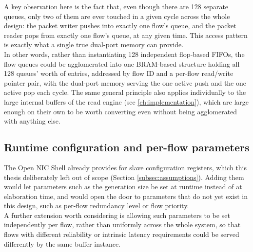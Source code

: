 A key observation here is the fact that, even though there are 128 separate queues,
only two of them are ever touched in a given cycle across the whole design: the packet writer
pushes into exactly one flow's queue, and the packet reader pops from exactly one flow's queue,
at any given time. This access pattern is exactly what a single true dual-port memory can provide. \\

In other words, rather than instantiating 128 independent flop-based FIFOs, the flow queues could 
be agglomerated into one BRAM-based structure holding all 128 queues' worth of entries, addressed by flow ID and a
per-flow read/write pointer pair, with the dual-port memory serving the one active push and the
one active pop each cycle. The same general principle also applies individually to the large
internal buffers of the read engine (see \ref{ch:implementation}), which are large enough on
their own to be worth converting even without being agglomerated with anything else.

\subsection{Runtime configuration and per-flow parameters}

The Open NIC Shell already provides for slave configuration registers, which this thesis
deliberately left out of scope (Section \ref{subsec:assumptions}). Adding them would let
parameters such as the generation size be set at runtime instead of at elaboration time, and
would open the door to parameters that do not yet exist in this design, such as per-flow
redundancy level or flow priority. \\ 

A further extension worth considering is allowing such
parameters to be set independently per flow, rather than uniformly across the whole system, so
that flows with different reliability or intrinsic latency requirements could be served differently by
the same buffer instance.

%


